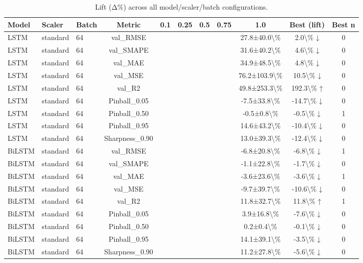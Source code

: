 \begin{table}
\caption{Lift (Δ\%) across all model/scaler/batch configurations.}
\label{tab:lift_all}
\begin{tabular}{lllcccccccc}
\toprule
Model & Scaler & Batch & Metric & 0.1 & 0.25 & 0.5 & 0.75 & 1.0 & Best (lift) & Best n \\
\midrule
LSTM & standard & 64 & val\_RMSE &  &  &  &  & 27.8±40.0\textbackslash \% & 2.0\textbackslash \% ↓ & 0 \\
LSTM & standard & 64 & val\_SMAPE &  &  &  &  & 31.6±40.2\textbackslash \% & 4.6\textbackslash \% ↓ & 0 \\
LSTM & standard & 64 & val\_MAE &  &  &  &  & 34.9±48.5\textbackslash \% & 4.8\textbackslash \% ↓ & 0 \\
LSTM & standard & 64 & val\_MSE &  &  &  &  & 76.2±103.9\textbackslash \% & 10.5\textbackslash \% ↓ & 0 \\
LSTM & standard & 64 & val\_R2 &  &  &  &  & 49.8±253.3\textbackslash \% & 192.3\textbackslash \% ↑ & 0 \\
LSTM & standard & 64 & Pinball\_0.05 &  &  &  &  & -7.5±33.8\textbackslash \% & -14.7\textbackslash \% ↓ & 0 \\
LSTM & standard & 64 & Pinball\_0.50 &  &  &  &  & -0.5±0.8\textbackslash \% & -0.5\textbackslash \% ↓ & 1 \\
LSTM & standard & 64 & Pinball\_0.95 &  &  &  &  & 14.6±43.2\textbackslash \% & -10.4\textbackslash \% ↓ & 0 \\
LSTM & standard & 64 & Sharpness\_0.90 &  &  &  &  & 13.0±39.3\textbackslash \% & -12.4\textbackslash \% ↓ & 0 \\
BiLSTM & standard & 64 & val\_RMSE &  &  &  &  & -6.8±20.8\textbackslash \% & -6.8\textbackslash \% ↓ & 1 \\
BiLSTM & standard & 64 & val\_SMAPE &  &  &  &  & -1.1±22.8\textbackslash \% & -1.7\textbackslash \% ↓ & 0 \\
BiLSTM & standard & 64 & val\_MAE &  &  &  &  & -3.6±23.6\textbackslash \% & -3.6\textbackslash \% ↓ & 1 \\
BiLSTM & standard & 64 & val\_MSE &  &  &  &  & -9.7±39.7\textbackslash \% & -10.6\textbackslash \% ↓ & 0 \\
BiLSTM & standard & 64 & val\_R2 &  &  &  &  & 11.8±32.7\textbackslash \% & 11.8\textbackslash \% ↑ & 1 \\
BiLSTM & standard & 64 & Pinball\_0.05 &  &  &  &  & 3.9±16.8\textbackslash \% & -7.6\textbackslash \% ↓ & 0 \\
BiLSTM & standard & 64 & Pinball\_0.50 &  &  &  &  & 0.2±0.4\textbackslash \% & -0.1\textbackslash \% ↓ & 0 \\
BiLSTM & standard & 64 & Pinball\_0.95 &  &  &  &  & 14.1±39.1\textbackslash \% & -3.5\textbackslash \% ↓ & 0 \\
BiLSTM & standard & 64 & Sharpness\_0.90 &  &  &  &  & 11.2±27.8\textbackslash \% & -5.6\textbackslash \% ↓ & 0 \\
\bottomrule
\end{tabular}
\end{table}
